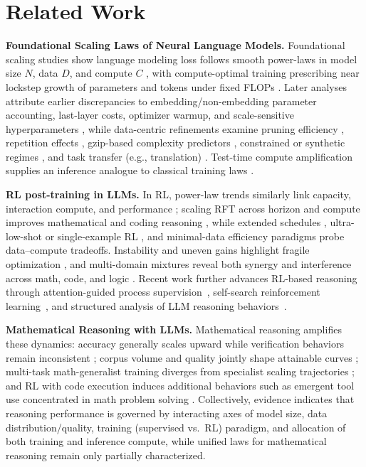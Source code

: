 \section{Related Work}
\textbf{Foundational Scaling Laws of Neural Language Models.} Foundational scaling studies show language modeling loss follows smooth power-laws in model size $N$, data $D$, and compute $C$ \citep{kaplan2020scaling}, with compute-optimal training prescribing near lockstep growth of parameters and tokens under fixed FLOPs \citep{hoffmann2022training}. Later analyses attribute earlier discrepancies to embedding/non-embedding parameter accounting, last-layer costs, optimizer warmup, and scale-sensitive hyperparameters \citep{pearce2024reconciling,porian2024resolving}, while data-centric refinements examine pruning efficiency \citep{sorscher2022beyond}, repetition effects \citep{hernandez2022scaling}, gzip-based complexity predictors \citep{pandey2024gzip}, constrained or synthetic regimes \citep{muennighoff2023scaling,qin2025scaling}, and task transfer (e.g., translation) \citep{isik2024scaling}. Test-time compute amplification supplies an inference analogue to classical training laws \citep{snell2024scaling}. 

\textbf{RL post-training in LLMs.} In RL, power-law trends similarly link capacity, interaction compute, and performance \citep{hilton2023scaling}; scaling RFT across horizon and compute improves mathematical and coding reasoning \citep{guo2025deepseekr1,kimi2025scaling,mai2025agent,zhang2025landscapeagenticreinforcementlearning,zhang2025surveyreinforcementlearninglarge}, while extended schedules \citep{liu2025prorl}, ultra-low-shot or single-example RL \citep{wang2025reinforcement}, and minimal-data efficiency paradigms \citep{li2025limr} probe data–compute tradeoffs. Instability and uneven gains highlight fragile optimization \citep{zeng2025simplerlzoo,yue2025doesrlincentivize}, and multi-domain mixtures reveal both synergy and interference across math, code, and logic \citep{li2025onedomainhelps,cheng2025revisiting}. Recent work further advances RL-based reasoning through attention-guided process supervision~\citep{nie2026attnpo}, self-search reinforcement learning~\citep{fan2025ssrl}, and structured analysis of LLM reasoning behaviors~\citep{yuan2025understandingllmreasoningabstractive}.

\textbf{Mathematical Reasoning with LLMs.} Mathematical reasoning amplifies these dynamics: accuracy generally scales upward while verification behaviors remain inconsistent \citep{touvron2023scaling}; corpus volume and quality jointly shape attainable curves \citep{ye2024skywork}; multi-task math-generalist training diverges from specialist scaling trajectories \citep{yue2023mammoth}; and RL with code execution induces additional behaviors such as emergent tool use concentrated in math problem solving \citep{zeng2025agent}. Collectively, evidence indicates that reasoning performance is governed by interacting axes of model size, data distribution/quality, training (supervised vs.\ RL) paradigm, and allocation of both training and inference compute, while unified laws for mathematical reasoning remain only partially characterized.